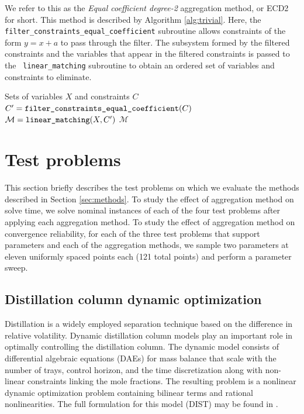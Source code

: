 \documentclass[smallextended]{svjour3}
\newcommand{\rev}[1]{{#1}}
\begin{document}
We refer to this as the {\it Equal coefficient degree-2} aggregation method, or ECD2 for short.
This method is described by Algorithm \ref{alg:trivial}.
Here, the {\tt filter\_constraints\_equal\_coefficient} subroutine allows constraints of the form
$y=x+a$ to pass through the filter. The subsystem formed by the filtered constraints
and the variables that appear in the filtered constraints is passed to the {\tt
linear\_matching} subroutine to obtain an ordered set of variables and constraints to
eliminate.
\begin{algorithm}
  \caption{: {\tt equal\_coefficient\_aggregation\_set}}
  \begin{algorithmic}[1]
     Sets of variables $X$ and constraints $C$
    \State $C' = \text{\tt filter\_constraints\_equal\_coefficient}(C)$
    \State $\mathcal{M} = \text{\tt linear\_matching}(X, C')$
     $\mathcal{M}$
  \end{algorithmic}
  \label{alg:trivial}
\end{algorithm}

\section{Test problems}
\label{sec:problems}

This section briefly describes the test problems on which we evaluate the methods
described in Section \ref{sec:methods}.
To study the effect of aggregation method on solve time, we solve nominal instances
of each of the four test problems after applying each aggregation method.
To study the \rev{effect} of aggregation method on convergence reliability, for each
of the three test problems that support parameters and each of the aggregation methods,
we sample two parameters at eleven uniformly spaced points each (121 total points)
and perform a parameter sweep.

\subsection{Distillation column dynamic optimization}
Distillation is a widely employed separation technique based on the difference in relative
volatility. Dynamic distillation column models play an important role in optimally
controlling the distillation column. The dynamic model consists of differential algebraic equations
(DAEs) for mass balance that scale with the number of trays, control horizon, and the
time discretization along with non-linear constraints linking the mole fractions. The
resulting problem is a nonlinear dynamic optimization problem \rev{containing bilinear terms and rational nonlinearities}.
The full formulation for this model (DIST) may be found in \cite{parker2022}. 
\end{document}
